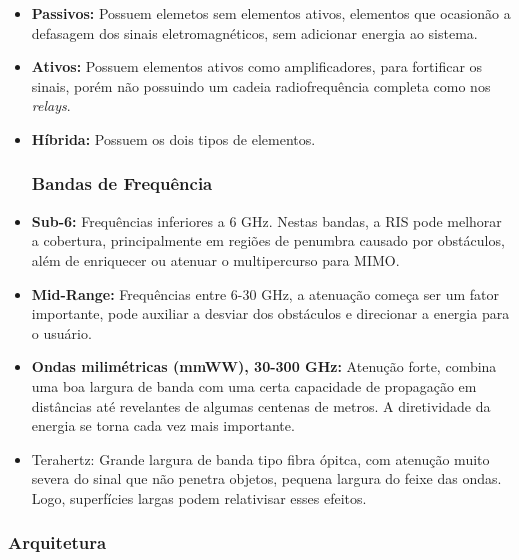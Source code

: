 \documentclass[
	12pt,				%
	openright,			%
	oneside,			%
	a4paper,			%
	english,			%
	brazil				%
	]{abntex2}
\begin{document}
\begin{itemize}

\item \textbf{Passivos:} Possuem elemetos sem elementos ativos, elementos que ocasionão a defasagem dos sinais eletromagnéticos, sem adicionar energia ao sistema.

\item \textbf{Ativos:} Possuem elementos ativos como amplificadores, para fortificar os sinais, porém não possuindo um cadeia radiofrequência completa como nos \textit{relays}.

\item \textbf{Híbrida:} Possuem os dois tipos de elementos.

\subsubsection{Bandas de Frequência} 

\item \textbf{Sub-6:} Frequências inferiores a 6 GHz. Nestas bandas, a RIS pode melhorar a cobertura, principalmente em regiões de penumbra causado por obstáculos, além de enriquecer ou atenuar o multipercurso para MIMO.

\item \textbf{Mid-Range:} Frequências entre 6-30 GHz, a atenuação começa ser um fator importante, pode auxiliar a desviar dos obstáculos e direcionar a energia para o usuário.

\item \textbf{Ondas milimétricas (mmWW), 30-300 GHz:} Atenução forte, combina uma boa largura de banda com uma certa capacidade de propagação em distâncias até revelantes de algumas centenas de metros. A diretividade da energia se torna cada vez mais importante.

\item Terahertz: Grande largura de banda tipo fibra ópitca, com atenução muito severa do sinal que não penetra objetos, pequena largura do feixe das ondas. Logo, superfícies largas podem relativisar esses efeitos. 
\end{itemize}

\subsubsection{Arquitetura} 
\end{document}
